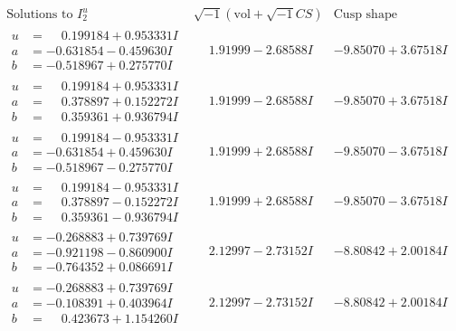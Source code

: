 \documentclass[1p]{elsarticle_modified}
\theoremstyle{definition}
\newcommand{\I}{\sqrt{-1}}
\begin{document}
$$\begin{array}{c|c|c}  
\text{Solutions to }I^u_{2}& \I (\text{vol} + \sqrt{-1}CS) & \text{Cusp shape}\\
 \hline 
\begin{aligned}
u &= \phantom{-}0.199184 + 0.953331 I \\
a &= -0.631854 - 0.459630 I \\
b &= -0.518967 + 0.275770 I\end{aligned}
 & \phantom{-}1.91999 - 2.68588 I & -9.85070 + 3.67518 I \\ \hline\begin{aligned}
u &= \phantom{-}0.199184 + 0.953331 I \\
a &= \phantom{-}0.378897 + 0.152272 I \\
b &= \phantom{-}0.359361 + 0.936794 I\end{aligned}
 & \phantom{-}1.91999 - 2.68588 I & -9.85070 + 3.67518 I \\ \hline\begin{aligned}
u &= \phantom{-}0.199184 - 0.953331 I \\
a &= -0.631854 + 0.459630 I \\
b &= -0.518967 - 0.275770 I\end{aligned}
 & \phantom{-}1.91999 + 2.68588 I & -9.85070 - 3.67518 I \\ \hline\begin{aligned}
u &= \phantom{-}0.199184 - 0.953331 I \\
a &= \phantom{-}0.378897 - 0.152272 I \\
b &= \phantom{-}0.359361 - 0.936794 I\end{aligned}
 & \phantom{-}1.91999 + 2.68588 I & -9.85070 - 3.67518 I \\ \hline\begin{aligned}
u &= -0.268883 + 0.739769 I \\
a &= -0.921198 - 0.860900 I \\
b &= -0.764352 + 0.086691 I\end{aligned}
 & \phantom{-}2.12997 - 2.73152 I & -8.80842 + 2.00184 I \\ \hline\begin{aligned}
u &= -0.268883 + 0.739769 I \\
a &= -0.108391 + 0.403964 I \\
b &= \phantom{-}0.423673 + 1.154260 I\end{aligned}
 & \phantom{-}2.12997 - 2.73152 I & -8.80842 + 2.00184 I \\ \hline\begin{aligned}

\end{aligned}
\end{array}$$
\end{document}
